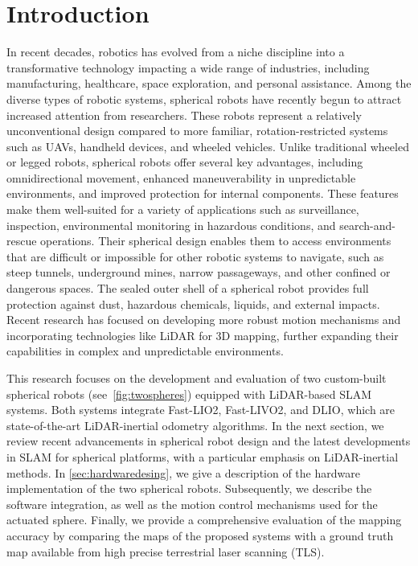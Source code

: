 \documentclass[conference]{IEEEtran}
\begin{document}
\section{Introduction}
In recent decades, robotics has evolved from a niche discipline into a transformative technology impacting a wide range of industries, including manufacturing, healthcare, space exploration, and personal assistance. 
Among the diverse types of robotic systems, spherical robots have recently begun to attract increased attention from researchers. These robots represent a relatively unconventional design compared to more familiar, rotation-restricted systems such as UAVs, handheld devices, and wheeled vehicles. 
Unlike traditional wheeled or legged robots, spherical robots offer several key advantages, including omnidirectional movement, enhanced maneuverability in unpredictable environments, and improved protection for internal components. 
These features make them well-suited for a variety of applications such as surveillance, inspection, environmental monitoring in hazardous conditions, and search-and-rescue operations. 
Their spherical design enables them to access environments that are difficult or impossible for other robotic systems to navigate, such as steep tunnels, underground mines, narrow passageways, and other confined or dangerous spaces.
The sealed outer shell of a spherical robot provides full protection against dust, hazardous chemicals, liquids, and external impacts. 
Recent research has focused on developing more robust motion mechanisms \cite{roboball,novelsphere,pendulum_sphere} and incorporating technologies like LiDAR for 3D mapping, further expanding their capabilities in complex and unpredictable environments\cite{Kalman_filter_sphere,DAEDALUS,sphere_Fabi_1}.

This research focuses on the development and evaluation of two custom-built spherical robots (see~\ref{fig:twospheres}) equipped with LiDAR-based SLAM systems. 
Both systems integrate Fast-LIO2\cite{fastlio2}, Fast-LIVO2\cite{fastlivo2}, and DLIO\cite{dlio}, which are state-of-the-art LiDAR-inertial odometry algorithms.
In the next section, we review recent advancements in spherical robot design and the latest developments in SLAM for spherical platforms, with a particular emphasis on LiDAR-inertial methods. 
In \ref{sec:hardwaredesing}, we give a description of the hardware implementation of the two spherical robots. 
Subsequently, we describe the software integration, as well as the motion control mechanisms used for the actuated sphere. 
Finally, we provide a comprehensive evaluation of the mapping accuracy by comparing the maps of the proposed systems with a ground truth map available from high precise terrestrial laser scanning (TLS). 
\end{document}
